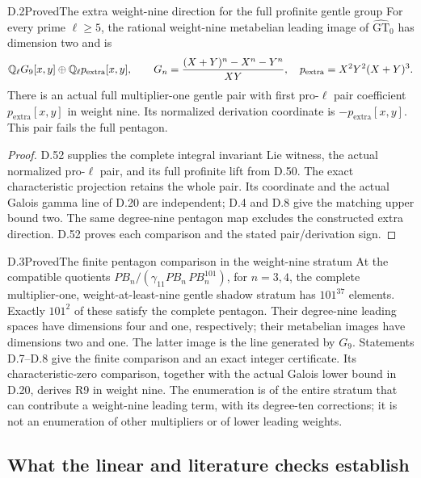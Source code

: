 \begin{statement}{D.2}{Proved}{The extra weight-nine direction for the full profinite gentle group}
For every prime $\ell\geq5$, the rational weight-nine metabelian
leading image of $\widehat{\mathrm{GT}}_0$ has dimension two and is
\[
 \mathbb Q_\ell G_9[x,y]\oplus\mathbb Q_\ell p_{\mathrm{extra}}[x,y],
 \qquad
 G_n=\frac{(X+Y)^n-X^n-Y^n}{XY},\quad
 p_{\mathrm{extra}}=X^2Y^2(X+Y)^3.
\]
There is an actual full multiplier-one gentle pair with first
pro-$\ell$ pair coefficient $p_{\mathrm{extra}}[x,y]$ in weight nine.
Its normalized derivation coordinate is
$-p_{\mathrm{extra}}[x,y]$. This pair fails the full pentagon.
\end{statement}
\begin{proof}
D.52 supplies the complete integral invariant Lie witness, the actual
normalized pro-$\ell$ pair, and its full profinite lift from D.50.
The exact characteristic projection retains the whole pair. Its
coordinate and the actual Galois gamma line of D.20 are independent;
D.4 and D.8 give the matching upper bound two. The same degree-nine
pentagon map excludes the constructed extra direction. D.52 proves
each comparison and the stated pair/derivation sign.
\end{proof}

\begin{statement}{D.3}{Proved}{The finite pentagon comparison in the weight-nine stratum}
At the compatible quotients
$PB_n/(\gamma_{11}PB_n\,PB_n^{101})$, for $n=3,4$, the complete
multiplier-one, weight-at-least-nine gentle shadow stratum has
$101^{37}$ elements. Exactly $101^2$ of these satisfy the complete
pentagon. Their degree-nine leading spaces have dimensions four and
one, respectively; their metabelian images have dimensions two and
one. The latter image is the line generated by $G_9$.
Statements D.7--D.8 give the finite comparison and an exact integer
certificate. Its characteristic-zero comparison, together with the
actual Galois lower bound in D.20, derives R9 in weight nine.
The enumeration is of the entire stratum that can contribute a
weight-nine leading term, with its degree-ten corrections; it is
not an enumeration of other multipliers or of lower leading weights.
\end{statement}

\subsection{What the linear and literature checks establish}

